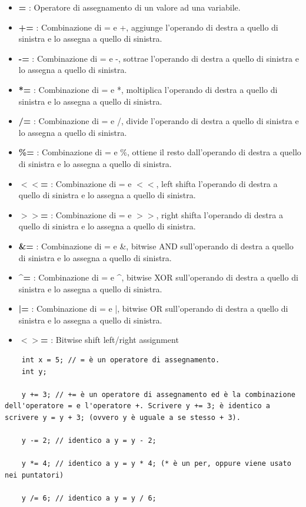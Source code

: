 \begin{itemize}
	\item \textsf{\small \textbf{=} : Operatore di assegnamento di un valore ad una variabile.}
	\item \textsf{\small \textbf{+=} : Combinazione di = e +, aggiunge l'operando di destra a quello di sinistra e lo assegna a quello di sinistra.}
	\item \textsf{\small \textbf{-=} : Combinazione di = e -, sottrae l'operando di destra a quello di sinistra e lo assegna a quello di sinistra.}
	\item \textsf{\small \textbf{*=} : Combinazione di = e *, moltiplica l'operando di destra a quello di sinistra e lo assegna a quello di sinistra.}
	\item \textsf{\small \textbf{/=} : Combinazione di = e /, divide l'operando di destra a quello di sinistra e lo assegna a quello di sinistra.}
	\item \textsf{\small \textbf{\%=} : Combinazione di = e \%, ottiene il resto dall'operando di destra a quello di sinistra e lo assegna a quello di sinistra.}
	\item \textsf{\small \textbf{$<<$=} : Combinazione di = e $<<$, left shifta l'operando di destra a quello di sinistra e lo assegna a quello di sinistra.}
	\item \textsf{\small \textbf{$>>$=} : Combinazione di = e $>>$, right shifta l'operando di destra a quello di sinistra e lo assegna a quello di sinistra.}
	\item \textsf{\small \textbf{\&=} : Combinazione di = e \&, bitwise AND sull'operando di destra a quello di sinistra e lo assegna a quello di sinistra.}
	\item \textsf{\small \textbf{\textasciicircum =} : Combinazione di = e \textasciicircum, bitwise XOR sull'operando di destra a quello di sinistra e lo assegna a quello di sinistra.}
	\item \textsf{\small \textbf{|=} : Combinazione di = e |, bitwise OR sull'operando di destra a quello di sinistra e lo assegna a quello di sinistra.}
	\item \textsf{\small \textbf{$<>$=} : Bitwise shift left/right assignment} 
\end{itemize}

\begin{lstlisting}
	int x = 5; // = è un operatore di assegnamento.
	int y;
	
	y += 3; // += è un operatore di assegnamento ed è la combinazione dell'operatore = e l'operatore +. Scrivere y += 3; è identico a scrivere y = y + 3; (ovvero y è uguale a se stesso + 3).
	
	y -= 2; // identico a y = y - 2;
	
	y *= 4; // identico a y = y * 4; (* è un per, oppure viene usato nei puntatori)
	
	y /= 6; // identico a y = y / 6;
	
\end{lstlisting}

